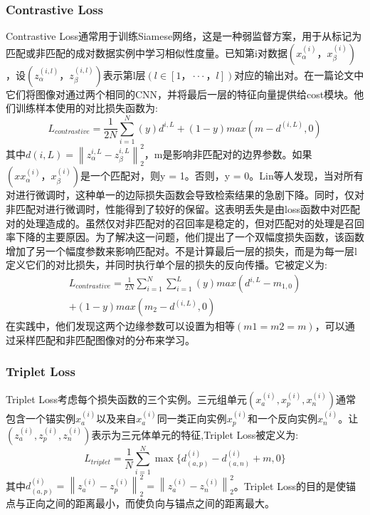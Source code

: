 \documentclass[final]{cvpr}
\begin{document}
\subsubsection{Contrastive Loss}
Contrastive Loss通常用于训练Siamese网络，这是一种弱监督方案，用于从标记为匹配或非匹配的成对数据实例中学习相似性度量。已知第i对数据$(x^{(i)}_\alpha，x^{(i)}_\beta)$，设$(z^{(i,l)}_\alpha，z^{(i,l)}_\beta)$表示第l层$(l\in[1，···，l])$对应的输出对。在一篇论文中它们将图像对通过两个相同的CNN，并将最后一层的特征向量提供给cost模块。他们训练样本使用的对比损失函数为:
\begin{equation}
	L_{contrastive}=\frac{1}{2N}\sum_{i=1}^N(y)d^{i,L}+(1-y)max(m-d^(i,L),0)
\end{equation}
其中$d(i,L)=\left\|z_\alpha^{i,L}-z^{i,L}_\beta\right\|_2^2$，m是影响非匹配对的边界参数。如果$(x x^{(i)}_\alpha，x^{(i)}_\beta)$是一个匹配对，则y = 1。否则，y = 0。Lin等人发现，当对所有对进行微调时，这种单一的边际损失函数会导致检索结果的急剧下降。同时，仅对非匹配对进行微调时，性能得到了较好的保留。这表明丢失是由loss函数中对匹配对的处理造成的。虽然仅对非匹配对的召回率是稳定的，但对匹配对的处理是召回率下降的主要原因。为了解决这一问题，他们提出了一个双幅度损失函数，该函数增加了另一个幅度参数来影响匹配对。不是计算最后一层的损失，而是为每一层l定义它们的对比损失，并同时执行单个层的损失的反向传播。它被定义为:
\begin{equation}
\begin{split}
	L_{contrastive}=\frac{1}{2N}\sum_{i=1}^N\sum_{i=1}^L(y)max(d^{i,L}-m_{1,0})\\
	+(1-y)max(m_2-d^{(i,L)},0)
\end{split}
\end{equation}
在实践中，他们发现这两个边缘参数可以设置为相等$(m1= m2= m)$，可以通过采样匹配和非匹配图像对的分布来学习。
\subsubsection{Triplet Loss}
Triplet Loss考虑每个损失函数的三个实例。三元组单元$(x^{(i)}_a,x^{(i)}_p, x^{(i)}_n)$通常包含一个锚实例$x_a^{(i)}$以及来自$x_a^{(i)}$同一类正向实例$x_p^{(i)}$和一个反向实例$x_n^{(i)}$。让$(z_a^{(i)},z_p^{(i)},z_n^{(i)})$表示为三元体单元的特征,Triplet Loss被定义为:
\begin{equation}
	L_{triplet}=\frac{1}{N}\sum_{i=1}^N\max\{d_{(a,p)}^{(i)}-d_{(a,n)}^{(i)}+m,0\}
\end{equation}
其中$d_{(a,p)}^{(i)}=\left\|z_a^{(i)}-z_p^{(i)}\right\|_2^2 = \left\|z_a^{(i)}-z_n^{(i)}\right\|_2^2$。Triplet Loss的目的是使锚点与正向之间的距离最小，而使负向与锚点之间的距离最大。
\end{document}
